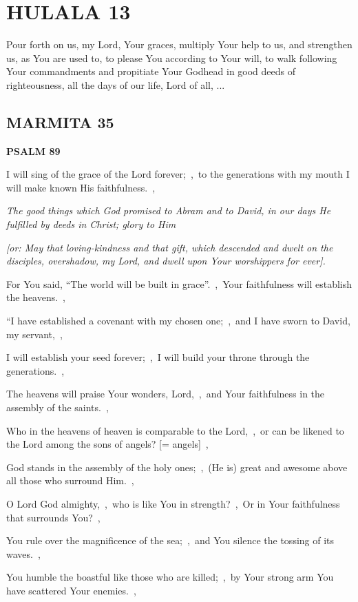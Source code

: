 \documentclass[12pt,twoside,a5paper]{article}
\newcommand{\hulala}[1]{\section*{HULALA {#1}}}
\newcommand{\marmita}[1]{\subsection*{MARMITA {#1}}}
\newcommand{\psalm}[1]{\textbf{PSALM {#1}}\nopagebreak}
\newcommand{\qanona}[1]{{\liturgicalhint{Qanona.} \emph{#1}}}
\newcommand{\slota}[1]{\liturgicalhint{Slota.} #1}
\newcommand{\translationoption}[1]{\emph{or:} #1}
\begin{document}

\hulala{13}

\slota{Pour forth on us, my Lord, Your graces, multiply Your help to us, and strengthen us, as You are used to, to please You according to Your will, to walk following Your commandments and propitiate Your Godhead in good deeds of righteousness, all the days of our life, Lord of all, ...}

\marmita{35}

\psalm{89}

\begin{normalparskip}
  I will sing of the grace of the Lord forever;~\sep\ to the generations with my mouth I will make known His faithfulness.~\sep

  \qanona{The good things which God promised to Abram and to David, in our days He fulfilled by deeds in Christ; glory to Him}

  \emph{[\translationoption{May that loving-kindness and that gift, which descended and dwelt on the disciples, overshadow, my Lord, and dwell upon Your worshippers for ever}].}

  For You said, ``The world will be built in grace''.~\sep\ Your faithfulness will establish the heavens.~\sep

  ``I have established a covenant with my chosen one;~\sep\ and I have sworn to David, my servant,~\sep

  I will establish your seed forever;~\sep\ I will build your throne through the generations.~\sep

  The heavens will praise Your wonders, Lord,~\sep\ and Your faithfulness in the assembly of the saints.~\sep

  Who in the heavens of heaven is comparable to the Lord,~\sep\ or can be likened to the Lord among the sons of angels? [= angels]~\sep

  God stands in the assembly of the holy ones;~\sep\ (He is) great and awesome above all those who surround Him.~\sep

  O Lord God almighty,~\sep\ who is like You in strength?~\sep\ Or in Your faithfulness that surrounds You?~\sep

  You rule over the magnificence of the sea;~\sep\ and You silence the tossing of its waves.~\sep

  You humble the boastful like those who are killed;~\sep\ by Your strong arm You have scattered Your enemies.~\sep


\end{normalparskip}
\end{document}
